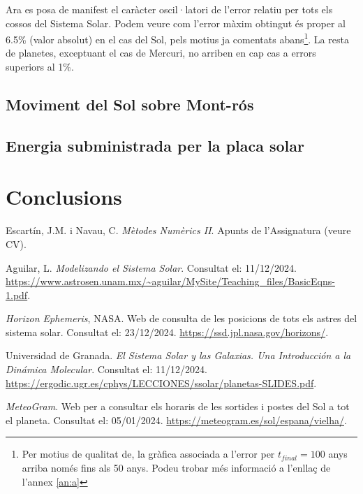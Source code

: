 \documentclass[10pt, twoside, a4paper]{article}
\begin{document}
Ara es posa de manifest el caràcter oscil·latori de l'error relatiu per tots els cossos del Sistema Solar. Podem veure com l'error màxim obtingut és proper al 6.5\% (valor absolut) en el cas del Sol, pels motius ja comentats abans\footnote{Per motius de qualitat de, la gràfica associada a l'error per $t_{final}=100$ anys arriba només fins als 50 anys. Podeu trobar més informació a l'enllaç de l'annex \ref{an:a}}. La resta de planetes, exceptuant el cas de Mercuri, no arriben en cap cas a errors superiors al 1\%.




\subsection{Moviment del Sol sobre Mont-rós}


\subsection{Energia subministrada per la placa solar}


\section{Conclusions}



\newpage
\begin{thebibliography}{99}
    Escartín, J.M. i Navau, C. \textit{Mètodes Numèrics II}. Apunts de l'Assignatura (veure CV).

    Aguilar, L. \textit{Modelizando el Sistema Solar}. Consultat el: 11/12/2024. \url{https://www.astrosen.unam.mx/~aguilar/MySite/Teaching_files/BasicEqns-1.pdf}.

    \textit{Horizon Ephemeris}, NASA. Web de consulta de les posicions de tots els astres del sistema solar. Consultat el: 23/12/2024. \url{https://ssd.jpl.nasa.gov/horizons/}.

    Universidad de Granada. \textit{El Sistema Solar y las Galaxias. Una Introducción a la Dinámica Molecular}. Consultat el: 11/12/2024. \url{https://ergodic.ugr.es/cphys/LECCIONES/ssolar/planetas-SLIDES.pdf}.

    \textit{MeteoGram}. Web per a consultar els horaris de les sortides i postes del Sol a tot el planeta. Consultat el: 05/01/2024. \url{https://meteogram.es/sol/espana/vielha/}.

    
\end{thebibliography}
\end{document}
